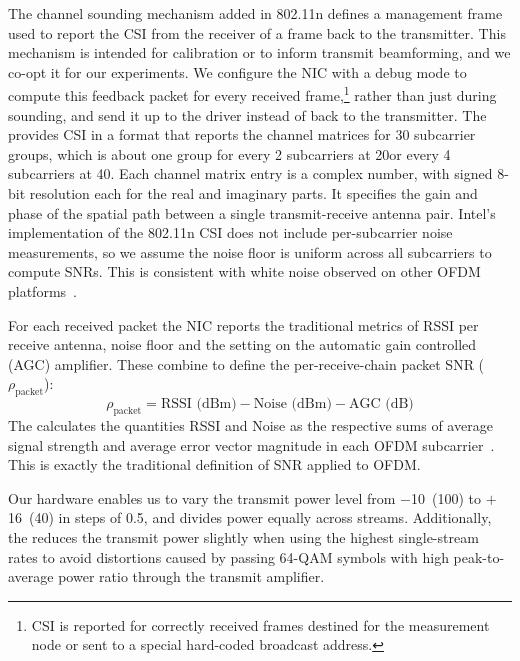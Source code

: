  The channel sounding mechanism added in 802.11n defines a management frame used to report the CSI from the receiver of a frame back to the transmitter. This mechanism is intended for calibration or to inform transmit beamforming, and we co-opt it for our experiments. We configure the NIC with a debug mode to compute this feedback packet for every received frame,\footnote{CSI is reported for correctly received frames destined for the measurement node or sent to a special hard-coded broadcast address.} rather than just during sounding, and send it up to the driver instead of back to the transmitter. The  provides CSI in a format that reports the channel matrices for 30 subcarrier groups, which is about one group for every 2 subcarriers at 20\MHz or every 4 subcarriers at 40\MHz. Each channel matrix entry is a complex number, with signed 8-bit resolution each for the real and imaginary parts. It specifies the gain and phase of the spatial path between a single transmit-receive antenna pair. Intel's implementation of the 802.11n CSI does not include per-subcarrier noise measurements, so we assume the noise floor is uniform across all subcarriers to compute SNRs. This is consistent with white noise observed on other OFDM platforms~\cite{Rahul_FARA}.

For each received packet the NIC reports the traditional metrics of RSSI per receive antenna, noise floor and the setting on the automatic gain controlled (AGC) amplifier. These combine to define the per-receive-chain packet SNR ($\rho_{\text{packet}}$):
\begin{equation}
\label{eq:per_chain_snr}
	\rho_{\text{packet}} = \text{RSSI (dBm)} - \text{Noise (dBm)} - \text{AGC (dB)}
\end{equation}
The  calculates the quantities RSSI and Noise as the respective sums of average signal strength and average error vector magnitude in each OFDM subcarrier~\cite{iwlwifi}. This is exactly the traditional definition of SNR applied to OFDM\@.

 Our hardware enables us to vary the transmit power level from $-$10\dBm~(100\uW) to $+$16\dBm~(40\mW) in steps of 0.5\dB, and divides power equally across streams. Additionally, the  reduces the transmit power slightly when using the highest single-stream rates to avoid distortions caused by passing 64-QAM symbols with high peak-to-average power ratio through the transmit amplifier.

